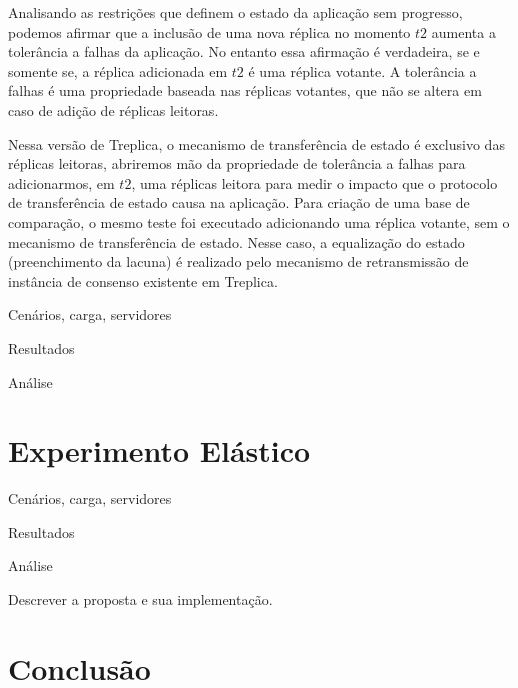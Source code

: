 Analisando as restrições que definem o estado da aplicação sem progresso, podemos afirmar
que a inclusão de uma nova réplica no momento $t2$ aumenta a tolerância a falhas da
aplicação. No entanto essa afirmação é verdadeira, se e somente se, a réplica adicionada
em $t2$ é uma réplica votante. A tolerância a falhas é uma propriedade baseada nas
réplicas votantes, que não se altera em caso de adição de réplicas leitoras.

Nessa versão de Treplica, o mecanismo de transferência de estado é exclusivo das réplicas
leitoras, abriremos mão da propriedade de tolerância a falhas para adicionarmos, em $t2$,
uma réplicas leitora para medir o impacto que o protocolo de transferência de estado
causa na aplicação. Para criação de uma base de comparação, o mesmo teste foi executado
adicionando uma réplica votante, sem o mecanismo de transferência de estado. Nesse caso, a
equalização do estado (preenchimento da lacuna) é realizado pelo mecanismo de
retransmissão de instância de consenso existente em Treplica.



Cenários, carga, servidores

Resultados

Análise

\section{Experimento Elástico}\label{sec:experimento_replicas_leitoras}

Cenários, carga, servidores

Resultados

Análise


Descrever a proposta e sua implementação.

\section{Conclusão}\label{sec:conclusao}

